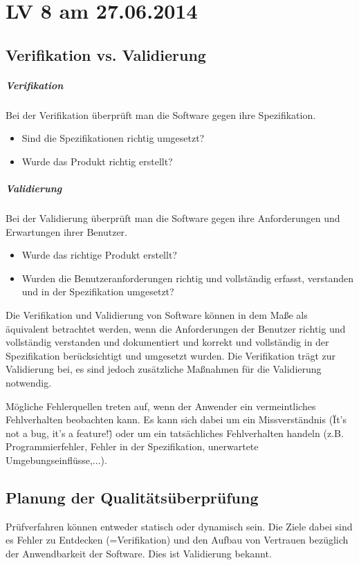 \chapter{LV 8 am 27.06.2014}
\section{Verifikation vs. Validierung}
\paragraph{Verifikation}
Bei der Verifikation überprüft man die Software gegen ihre Spezifikation.
\begin{itemize}
\item Sind die Spezifikationen richtig umgesetzt?
\item Wurde das Produkt richtig erstellt?
\end{itemize}

\paragraph{Validierung}
Bei der Validierung überprüft man die Software gegen ihre Anforderungen und Erwartungen ihrer Benutzer.
\begin{itemize}
\item Wurde das richtige Produkt erstellt?
\item Wurden die Benutzeranforderungen richtig und vollständig erfasst, verstanden und in der Spezifikation umgesetzt?
\end{itemize}

Die Verifikation und Validierung von Software können in dem Maße als äquivalent betrachtet werden, wenn die Anforderungen der Benutzer richtig und vollständig verstanden und dokumentiert und korrekt und vollständig in der Spezifikation berücksichtigt und umgesetzt wurden.
Die Verifikation trägt zur Validierung bei, es sind jedoch zusätzliche Maßnahmen für die Validierung notwendig.

Mögliche Fehlerquellen treten auf, wenn der Anwender ein vermeintliches Fehlverhalten beobachten kann. Es kann sich dabei um ein Missverständnis (\"It's not a bug, it's a feature!\") oder um ein tatsächliches Fehlverhalten handeln (z.B. Programmierfehler, Fehler in der Spezifikation, unerwartete Umgebungseinflüsse,...).

\section{Planung der Qualitätsüberprüfung}
Prüfverfahren können entweder statisch oder dynamisch sein. Die Ziele dabei sind es Fehler zu Entdecken (=Verifikation) und den Aufbau von Vertrauen bezüglich der Anwendbarkeit der Software. Dies ist Validierung bekannt. 

